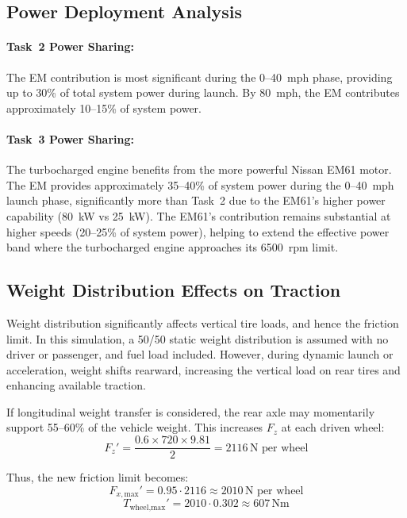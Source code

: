 \subsection{Power Deployment Analysis}

\paragraph{Task~2 Power Sharing:}
The EM contribution is most significant during the 0--40~mph phase, providing up to 30\% of total system power during launch. By 80~mph, the EM contributes approximately 10--15\% of system power.

\paragraph{Task~3 Power Sharing:}
The turbocharged engine benefits from the more powerful Nissan EM61 motor. The EM provides approximately 35--40\% of system power during the 0--40~mph launch phase, significantly more than Task~2 due to the EM61's higher power capability (80~kW vs 25~kW). The EM61's contribution remains substantial at higher speeds (20--25\% of system power), helping to extend the effective power band where the turbocharged engine approaches its 6500~rpm limit.

\subsection{Weight Distribution Effects on Traction}

Weight distribution significantly affects vertical tire loads, and hence the friction limit. In this simulation, a 50/50 static weight distribution is assumed with no driver or passenger, and fuel load included. However, during dynamic launch or acceleration, weight shifts rearward, increasing the vertical load on rear tires and enhancing available traction.

If longitudinal weight transfer is considered, the rear axle may momentarily support 55--60\% of the vehicle weight. This increases $F_z$ at each driven wheel:
\begin{equation}
F_z' = \frac{0.6 \times 720 \times 9.81}{2} = 2116\, \text{N per wheel}
\end{equation}

Thus, the new friction limit becomes:
\begin{equation}
F_{x, \text{max}}' = 0.95 \cdot 2116 \approx 2010\, \text{N per wheel}
\end{equation}
\begin{equation}
T_{\text{wheel,max}}' = 2010 \cdot 0.302 \approx 607\, \text{Nm}
\end{equation}

